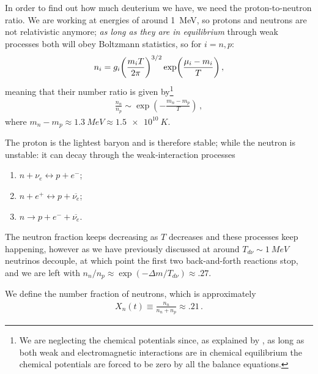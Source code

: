 \documentclass[main.tex]{subfiles}
\begin{document}
In order to find out how much deuterium we have, we need the proton-to-neutron ratio. 
We are working at energies of around \SI{1}{MeV}, so protons and neutrons are not relativistic anymore; \emph{as long as they are in equilibrium} through weak processes both will obey Boltzmann statistics, so for \(i = n, p\): 
%
\begin{align}
  n_i = g_{i} \qty(\frac{m_i T}{2 \pi })^{3/2} \exp(\frac{\mu_i - m_i}{T})
\,,
\end{align}
%
meaning that their number ratio is given by\footnote{We are neglecting the chemical potentials since, as explained by \textcite[sec.\ 8.6.2]{colespCosmology2002}, as long as both weak and electromagnetic interactions are in chemical equilibrium the chemical potentials are forced to be zero by all the balance equations.}
%
\begin{align}
  \frac{n_n}{n_p} \sim \exp(-\frac{m_n - m_p}{T})
\,,
\end{align}
%
where \(m_n - m_p \approx \SI{1.3}{MeV} \approx \SI{1.5e10}{K}\).

The proton is the lightest baryon and is therefore stable; while the neutron is unstable: it can decay through the weak-interaction processes 
\begin{enumerate}
    \item \(n + \nu _e \leftrightarrow p + e^{-}\);
    \item \(n + e^{+} \leftrightarrow p + \overline{\nu _e} \);
    \item \(n \rightarrow p + e^{-} + \overline{\nu _e} \).
\end{enumerate}

The neutron fraction keeps decreasing as \(T\) decreases and these processes keep happening, however as we have previously discussed at around \(T_{d \nu } \sim \SI{1}{MeV}\) neutrinos decouple, at which point the first two back-and-forth reactions stop, and we are left with \(n_n / n_p \approx \exp(- \Delta m / T_{d \nu }) \approx \num{.27}\). 

We define the number fraction of neutrons, which is approximately
%
\begin{align}
  X_n (t) \equiv \frac{n_n}{n_n+n_p} \approx \num{.21}
\,.
\end{align}
\end{document}

